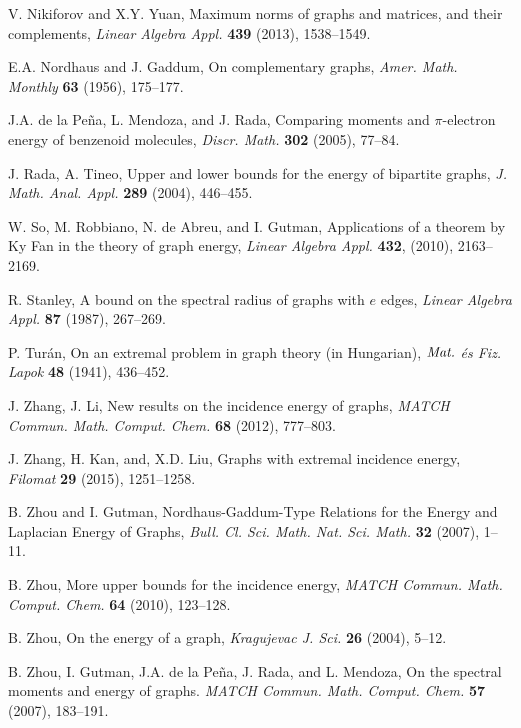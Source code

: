 \documentclass[12pt]{article}%
\begin{document}
\begin{thebibliography}{99}
V. Nikiforov and X.Y. Yuan, Maximum norms of graphs and
matrices, and their complements, \emph{Linear Algebra Appl.} \textbf{439}
(2013), 1538--1549.

E.A. Nordhaus and J. Gaddum, On complementary graphs,
\emph{Amer. Math. Monthly} \textbf{63} (1956), 175--177.

J.A. de la Pe\~{n}a, L. Mendoza, and J. Rada, Comparing
moments and $\pi$-electron energy of benzenoid molecules, \emph{Discr. Math.}
\textbf{302} (2005), 77--84.

J. Rada, A. Tineo, Upper and lower bounds for the energy of
bipartite graphs, \emph{J. Math. Anal. Appl.} \textbf{289} (2004), 446--455.

W. So, M. Robbiano, N. de Abreu, and I. Gutman, Applications
of a theorem by Ky Fan in the theory of graph energy, \emph{Linear Algebra
Appl.} \textbf{432}, (2010), 2163--2169.

R. Stanley, A bound on the spectral radius of graphs with $e$
edges, \emph{Linear Algebra Appl.} \textbf{87 }(1987), 267--269.

P. Tur\'{a}n, On an extremal problem in graph theory (in
Hungarian), $\emph{Mat.}$ \emph{\'{e}s Fiz. Lapok} \textbf{48 }(1941), 436--452.

J. Zhang, J. Li, New results on the incidence energy of
graphs, \emph{MATCH Commun. Math. Comput. Chem.} \textbf{68} (2012), 777--803.

J. Zhang, H. Kan, and, X.D. Liu, Graphs with extremal
incidence energy, \emph{Filomat} \textbf{29} (2015), 1251--1258.

B. Zhou and I. Gutman, Nordhaus-Gaddum-Type Relations for the
Energy and Laplacian Energy of Graphs, \emph{Bull. Cl. Sci. Math. Nat. Sci.
Math.} \textbf{32} (2007), 1--11.

B. Zhou, More upper bounds for the incidence energy,
\emph{MATCH Commun. Math. Comput. Chem.} \textbf{64} (2010), 123--128.

B. Zhou, On the energy of a graph, \emph{Kragujevac J. Sci.}
\textbf{26 }(2004), 5--12.

B. Zhou, I. Gutman, J.A. de la Pe\~{n}a, J. Rada, and L.
Mendoza, On the spectral moments and energy of graphs. \emph{MATCH Commun.
Math. Comput. Chem.} \textbf{57 }(2007), 183--191.
\end{thebibliography}
\end{document}
